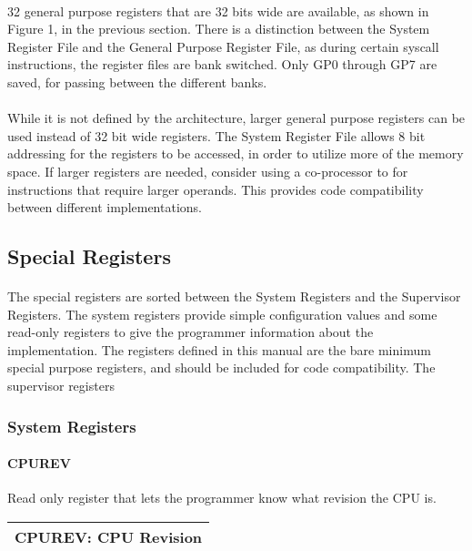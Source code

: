 \documentclass[letterpaper, 11pt]{article}
\begin{document}
\paragraph{}32 general purpose registers that are 32 bits wide are available, as shown in Figure 1, in the previous section. 
There is a distinction between the System Register File and the General Purpose Register File, as during certain syscall
instructions, the register files are bank switched. Only GP0 through GP7 are saved, for passing between the different banks. 

\paragraph{}While it is not defined by the architecture, larger general purpose registers can be used instead of 32 bit wide registers. The System Register File allows 8 bit addressing for the registers to be accessed, in order to utilize more of the memory space.
If larger registers are needed, consider using a co-processor to for instructions that require larger operands. 
This provides code compatibility between different implementations.
\subsection{Special Registers}
\paragraph{}The special registers are sorted between the System Registers and the Supervisor Registers. The system registers provide
simple configuration values and some read-only registers to give the programmer information about the implementation.
The registers defined in this manual are the bare minimum special purpose registers, and
should be included for code compatibility.
The supervisor registers 
\subsubsection{System Registers}
\paragraph{CPUREV} Read only register that lets the programmer know what revision the CPU is. \\
\begin{center}
	\begin{tabular}{|c|c|c|c|c|c|}
		\hline
		\multicolumn{6}{|c|}{CPUREV: CPU Revision} \\
		\hline
		\hline
		
	\end{tabular}
\end{center}
\end{document}
